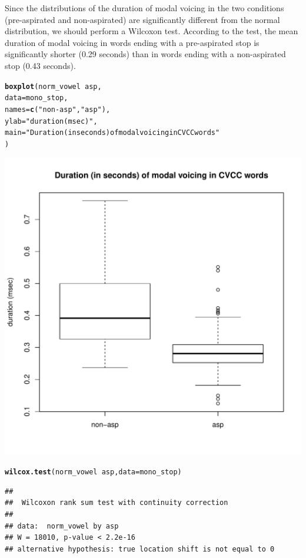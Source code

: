 \documentclass[a4paper,11pt]{article}\usepackage[]{graphicx}\usepackage[]{color}
\makeatletter
\def\maxwidth{ %
  \ifdim\Gin@nat@width>\linewidth
    \linewidth
  \else
    \Gin@nat@width
  \fi
}
\newcommand{\hlstr}[1]{\textcolor[rgb]{0.192,0.494,0.8}{#1}}%
\newcommand{\hlopt}[1]{\textcolor[rgb]{0,0,0}{#1}}%
\newcommand{\hlstd}[1]{\textcolor[rgb]{0.345,0.345,0.345}{#1}}%
\newcommand{\hlkwc}[1]{\textcolor[rgb]{0.333,0.667,0.333}{#1}}%
\newcommand{\hlkwd}[1]{\textcolor[rgb]{0.737,0.353,0.396}{\textbf{#1}}}%
\newenvironment{kframe}{%
 \def\at@end@of@kframe{}%
 \ifinner\ifhmode%
  \def\at@end@of@kframe{\end{minipage}}%
  \begin{minipage}{\columnwidth}%
 \fi\fi%
 \def\FrameCommand##1{\hskip\@totalleftmargin \hskip-\fboxsep
 \colorbox{shadecolor}{##1}\hskip-\fboxsep
     \hskip-\linewidth \hskip-\@totalleftmargin \hskip\columnwidth}%
 \MakeFramed {\advance\hsize-\width
   \@totalleftmargin\z@ \linewidth\hsize
   \@setminipage}}%
 {\par\unskip\endMakeFramed%
 \at@end@of@kframe}
\newenvironment{knitrout}{}{} %
\makeatother
\begin{document}
Since the distributions of the duration of modal voicing in the two conditions (pre-aspirated and non-aspirated) are significantly different from the normal distribution, we should perform a Wilcoxon test.
According to the test, the mean duration of modal voicing in words ending with a pre-aspirated stop is significantly shorter (0.29 seconds) than in words ending with a non-aspirated stop (0.43 seconds).

\begin{knitrout}
\color{fgcolor}\begin{kframe}
\begin{alltt}
\hlkwd{boxplot}\hlstd{(norm_vowel} \hlopt{~} \hlstd{asp,}
        \hlkwc{data} \hlstd{= mono_stop,}
        \hlkwc{names} \hlstd{=} \hlkwd{c}\hlstd{(}\hlstr{"non-asp"}\hlstd{,} \hlstr{"asp"}\hlstd{),}
        \hlkwc{ylab} \hlstd{=} \hlstr{"duration (msec)"}\hlstd{,}
        \hlkwc{main} \hlstd{=} \hlstr{"Duration (in seconds) of modal voicing in CVCC words"}
        \hlstd{)}
\end{alltt}
\end{kframe}
\includegraphics[width=\maxwidth]{img/mono-stop-box-1} 
\begin{kframe}\begin{alltt}
\hlkwd{wilcox.test}\hlstd{(norm_vowel} \hlopt{~} \hlstd{asp,} \hlkwc{data} \hlstd{= mono_stop)}
\end{alltt}
\begin{verbatim}
## 
## 	Wilcoxon rank sum test with continuity correction
## 
## data:  norm_vowel by asp
## W = 18010, p-value < 2.2e-16
## alternative hypothesis: true location shift is not equal to 0
\end{verbatim}
\end{kframe}
\end{knitrout}
\end{document}
